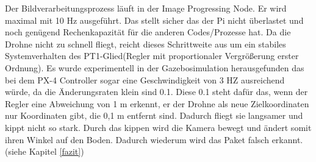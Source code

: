 Der Bildverarbeitungsprozess läuft in der Image Progressing Node. Er wird maximal mit 10 Hz ausgeführt. Das stellt sicher das der Pi nicht überlastet und noch genügend Rechenkapazität für die anderen Codes/Prozesse hat. Da die Drohne nicht zu schnell fliegt, reicht dieses Schrittweite aus um ein stabiles Systemverhalten des PT1-Glied(Regler mit proportionaler Vergrößerung erster Ordnung). Es wurde experimentell in der Gazebosimulation herausgefunden das bei dem PX-4 Controller sogar eine Geschwindigkeit von 3 HZ ausreichend würde, da die Änderungsraten klein sind 0.1. Diese 0.1 steht dafür das, wenn der Regler eine Abweichung von 1 m erkennt, er der Drohne als neue Zielkoordinaten nur Koordinaten gibt, die 0,1 m entfernt sind. Dadurch fliegt sie langsamer und kippt nicht so stark. Durch das kippen wird die Kamera bewegt und ändert somit ihren Winkel auf den Boden. Dadurch wiederum wird das Paket falsch erkannt. (siehe Kapitel \ref{fazit}) 